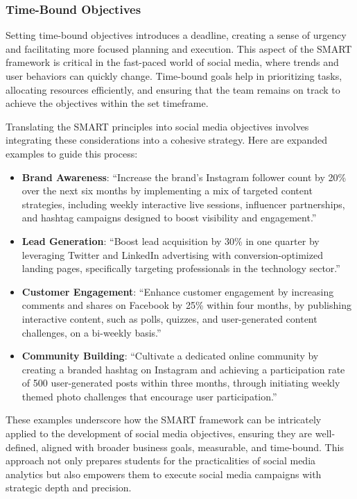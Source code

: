 \documentclass[
]{book}
\begin{document}
\hypertarget{time-bound-objectives}{%
\subsubsection*{Time-Bound Objectives}\label{time-bound-objectives}}

Setting time-bound objectives introduces a deadline, creating a sense of urgency and facilitating more focused planning and execution. This aspect of the SMART framework is critical in the fast-paced world of social media, where trends and user behaviors can quickly change. Time-bound goals help in prioritizing tasks, allocating resources efficiently, and ensuring that the team remains on track to achieve the objectives within the set timeframe.

Translating the SMART principles into social media objectives involves integrating these considerations into a cohesive strategy. Here are expanded examples to guide this process:

\begin{itemize}
\item
  \textbf{Brand Awareness}: ``Increase the brand's Instagram follower count by 20\% over the next six months by implementing a mix of targeted content strategies, including weekly interactive live sessions, influencer partnerships, and hashtag campaigns designed to boost visibility and engagement.''
\item
  \textbf{Lead Generation}: ``Boost lead acquisition by 30\% in one quarter by leveraging Twitter and LinkedIn advertising with conversion-optimized landing pages, specifically targeting professionals in the technology sector.''
\item
  \textbf{Customer Engagement}: ``Enhance customer engagement by increasing comments and shares on Facebook by 25\% within four months, by publishing interactive content, such as polls, quizzes, and user-generated content challenges, on a bi-weekly basis.''
\item
  \textbf{Community Building}: ``Cultivate a dedicated online community by creating a branded hashtag on Instagram and achieving a participation rate of 500 user-generated posts within three months, through initiating weekly themed photo challenges that encourage user participation.''
\end{itemize}

These examples underscore how the SMART framework can be intricately applied to the development of social media objectives, ensuring they are well-defined, aligned with broader business goals, measurable, and time-bound. This approach not only prepares students for the practicalities of social media analytics but also empowers them to execute social media campaigns with strategic depth and precision.
\end{document}
